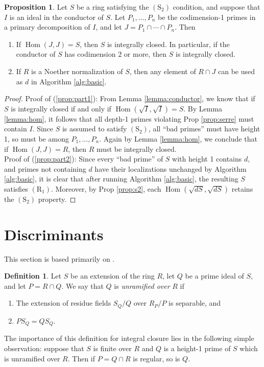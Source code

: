 \documentclass{amsart}
\theoremstyle{definition}
\newtheorem{definition}[theorem]{Definition}
\newtheorem{proposition}[theorem]{Proposition}
\DeclareMathOperator{\Hom}{Hom}
\newcommand{\Rone}{(\text{R}_1)}
\newcommand{\Stwo}{(\text{S}_2)}
\begin{document}
\begin{proposition}
Let $S$ be a ring satisfying the $\Stwo$ condition, and suppose that $I$ is an ideal in the conductor of $S$.  Let $P_1, \ldots, P_n$ be the codimension-1 primes in a primary decomposition of $I$, and let $J = P_1\cap \cdots \cap P_n$.  Then
\begin{enumerate}
\item\label{prop:part1} If $\Hom(J,J) = S$, then $S$ is integrally closed.  In particular, if the conductor of $S$ has codimension $2$ or more, then $S$ is integrally closed.
\item\label{prop:part2} If $R$ is a Noether normalization of $S$, then any element of $R\cap J$ can be used as $d$ in Algorithm \ref{alg:basic}.
\end{enumerate}
\end{proposition}
\begin{proof}
Proof of (\ref{prop:part1}): From Lemma \ref{lemma:conductor}, we know that if $S$ is integrally closed if and only if $\Hom(\sqrt{I},\sqrt{I}) = S$.  By Lemma \ref{lemma:hom}, it follows that all depth-1 primes violating Prop \ref{prop:serre} must contain $I$.  Since $S$ is assumed to satisfy $\Stwo$, all ``bad primes'' must have height 1, so must be among $P_1, \ldots, P_n$.  Again by Lemma \ref{lemma:hom}, we conclude that if $\Hom(J,J) = R$, then $R$ must be integrally closed.\\

Proof of (\ref{prop:part2}): Since every ``bad prime'' of $S$ with height 1 contains $d$, and primes not containing $d$ have their localizations unchanged by Algorithm \ref{alg:basic}, it is clear that after running Algorithm \ref{alg:basic}, the resulting $S$ satisfies $\Rone$.  Moreover, by Prop \ref{prop:s2}, each $\Hom(\sqrt{dS},\sqrt{dS})$ retains the $\Stwo$ property. 
\end{proof}


\section{Discriminants}
This section is based primarily on \cite{Na}.

\begin{definition}
Let $S$ be an extension of the ring $R$, let $Q$ be a prime ideal of $S$, and let $P = R\cap Q$.  We say that $Q$ is \emph{unramified over} $R$ if
\begin{enumerate}
\item The extension of residue fields $S_{Q}/Q$ over $R_P/P$ is separable, and
\item $PS_{Q} = QS_{Q}$.
\end{enumerate}

The importance of this definition for integral closure lies in the following simple observation: suppose that $S$ is finite over $R$ and $Q$ is a height-1 prime of $S$ which is unramified over $R$.  Then if $P = Q\cap R$ is regular, so is $Q$.
\end{definition}
\end{document}
